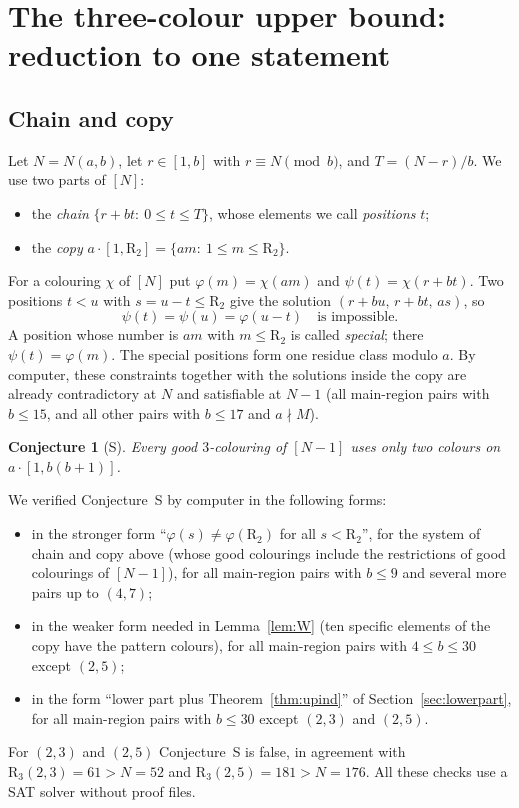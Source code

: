 \documentclass[11pt,a4paper]{article}
\newtheorem{conjecture}[theorem]{Conjecture}
\theoremstyle{definition}
\theoremstyle{remark}
\newcommand{\R}{\mathrm{R}}
\begin{document}
\clearpage
\section{The three-colour upper bound: reduction to one statement}\label{sec:upper}

\subsection{Chain and copy}
Let $N=N(a,b)$, let $r\in[1,b]$ with $r\equiv N\pmod b$, and $T=(N-r)/b$. We use two parts of $[N]$:
\begin{itemize}
\item the \emph{chain} $\{r+bt:\ 0\le t\le T\}$, whose elements we call \emph{positions} $t$;
\item the \emph{copy} $a\cdot[1,\R_2]=\{am:\ 1\le m\le \R_2\}$.
\end{itemize}
For a colouring $\chi$ of $[N]$ put $\varphi(m)=\chi(am)$ and $\psi(t)=\chi(r+bt)$. Two positions $t<u$ with $s=u-t\le\R_2$ give the solution $(r+bu,\,r+bt,\,as)$, so
\begin{equation}\label{eq:chain}
  \psi(t)=\psi(u)=\varphi(u-t)\quad\text{is impossible}.
\end{equation}
A position whose number is $am$ with $m\le\R_2$ is called \emph{special}; there $\psi(t)=\varphi(m)$. The special positions form one residue class modulo $a$.
By computer, these constraints together with the solutions inside the copy are already contradictory at $N$ and satisfiable at $N-1$ (all main-region pairs with $b\le15$, and all other pairs with $b\le17$ and $a\nmid M$).

\begin{conjecture}[S]
Every good $3$-colouring of $[N-1]$ uses only two colours on $a\cdot[1,b(b+1)]$.
\end{conjecture}

We verified Conjecture~S by computer in the following forms:
\begin{itemize}
\item in the stronger form ``$\varphi(s)\ne\varphi(\R_2)$ for all $s<\R_2$'', for the system of chain and copy above (whose good colourings include the restrictions of good colourings of $[N-1]$), for all main-region pairs with $b\le9$ and several more pairs up to $(4,7)$;
\item in the weaker form needed in Lemma~\ref{lem:W} (ten specific elements of the copy have the pattern colours), for all main-region pairs with $4\le b\le30$ except $(2,5)$;
\item in the form ``lower part plus Theorem~\ref{thm:upind}'' of Section~\ref{sec:lowerpart}, for all main-region pairs with $b\le30$ except $(2,3)$ and $(2,5)$.
\end{itemize}
For $(2,3)$ and $(2,5)$ Conjecture~S is false, in agreement with $\R_3(2,3)=61>N=52$ and $\R_3(2,5)=181>N=176$. All these checks use a SAT solver without proof files.
\end{document}
